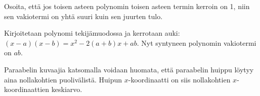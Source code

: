 \begin{tehtavasivu}
\begin{tehtava}
    Osoita, että jos toisen asteen polynomin toisen asteen termin kerroin on 1, niin sen vakiotermi on yhtä suuri kuin sen juurten tulo.
    \begin{vastaus}
        Kirjoitetaan polynomi tekijämuodossa ja kerrotaan auki: $(x-a)(x-b)=x^2-2(a+b)x+ab$. Nyt syntyneen polynomin vakiotermi on $ab$.
    \end{vastaus}
\end{tehtava}

\begin{tehtava}
    Paraabelin kuvaajia katsomalla voidaan huomata, että paraabelin huippu löytyy aina nollakohtien puolivälistä.
    Huipun $x$-koordinaatti on siis nollakohtien $x$-koordinaattien keskiarvo.
    \begin{alakohdat}
    \end{alakohdat}
    \begin{vastaus}
        \begin{alakohdat}
        \end{alakohdat}
    \end{vastaus}
\end{tehtava}

\end{tehtavasivu}
